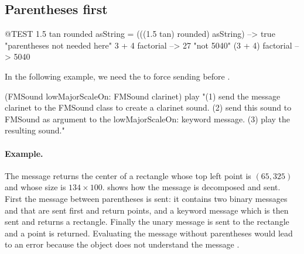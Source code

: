 \documentclass[a4paper,10pt,twoside]{book}
\begin{document}
\subsection{Parentheses first}


\begin{code}{@TEST}
1.5 tan rounded asString = (((1.5 tan) rounded) asString) --> true    "parentheses not needed here"
3 + 4 factorial   --> 27    "not 5040"
(3 + 4) factorial --> 5040
\end{code}

In the following example, we need the  to force sending  before .
\begin{code}{}
(FMSound lowMajorScaleOn: FMSound clarinet) play 
"(1) send the message clarinet to the FMSound class to create a clarinet sound.
 (2) send this sound to FMSound as argument to the lowMajorScaleOn: keyword message.
 (3) play the resulting sound."
\end{code}



\paragraph{Example.}
The message  returns the center of a rectangle whose top left point is $(65, 325)$ and whose size is $134{\times}100$.  shows how the message is decomposed and sent. First the message between parentheses is sent: it contains two binary messages  and  that are sent first and return points, and a keyword message  which is then sent and returns a rectangle. Finally the unary message  is sent to the rectangle and a point is returned. 
Evaluating the message without parentheses would lead to an error because the object  does not understand the message .
\end{document}
